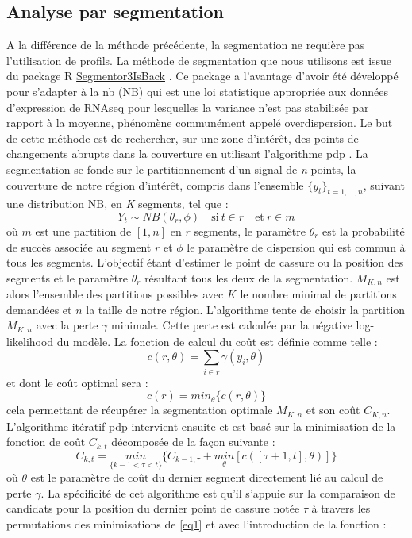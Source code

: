 \documentclass[12pt,a4paper]{report}
\begin{document}
\begin{onehalfspace}
\subsection*{Analyse par segmentation}

A la différence de la méthode précédente, la segmentation ne requière pas l'utilisation de profils. La méthode de segmentation que nous utilisons est issue du package R \href{http://cran.r-project.org/web/packages/Segmentor3IsBack/index.html}{Segmentor3IsBack} \citep{Cleynen2014}. Ce package a l'avantage d'avoir été développé pour s'adapter à la \gls{nb} (NB) qui est une loi statistique appropriée aux données d'expression de RNAseq pour lesquelles la variance n'est pas stabilisée par rapport à la moyenne, phénomène communément appelé overdispersion. Le but de cette méthode est de rechercher, sur une zone d'intérêt, des points de changements abrupts dans la couverture en utilisant l'algorithme \gls{pdp} \citep{Rigaill2010}. La segmentation se fonde sur le partitionnement d'un signal de \emph{n} points, la couverture de notre région d'intérêt, compris dans l'ensemble ${\{y_t\}_{t=1,\ldots,n}}$, suivant une distribution NB, en \emph{K} segments, tel que :
\[ Y_t \sim NB(\theta_r,\phi) \quad \text{si}\ t \in r \quad \text{et}\ r \in m \]
où $m$ est une partition de $[1,n]$ en $r$ segments, le paramètre $\theta_r$ est la probabilité de succès associée au segment $r$ et $\phi$ le paramètre de dispersion qui est commun à tous les segments. L'objectif étant d'estimer le point de cassure ou la position des segments et le paramètre $\theta_r$ résultant tous les deux de la segmentation. $M_{K,n}$ est alors l'ensemble des partitions possibles avec $K$ le nombre minimal de partitions demandées et $n$ la taille de notre région. L'algorithme tente de choisir la partition $M_{K,n}$ avec la perte $\gamma$ minimale. Cette perte est calculée par la négative log-likelihood du modèle. La fonction de calcul du coût est définie comme telle :
\[ c(r,\theta) = \sum_{i \in r} \gamma(y_i,\theta) \]
et dont le coût optimal sera :
\[ c(r) = min_\theta\{c(r,\theta)\} \]
cela permettant de récupérer la segmentation optimale $M_{K,n}$ et son coût $C_{K,n}$. L'algorithme itératif \gls{pdp} intervient ensuite et est basé sur la minimisation de la fonction de coût $C_{k,t}$ décomposée de la façon suivante :
\begin{equation}
\label{eq1}
C_{k,t} = \underset{\{k-1<\tau<t\}}{min} \{C_{k-1,\tau} + \underset{\theta}{min}[c([\tau + 1,t],\theta)]\}
\end{equation}
où $\theta$ est le paramètre de coût du dernier segment directement lié au calcul de perte $\gamma$. La spécificité de cet algorithme est qu'il s'appuie sur la comparaison de candidats pour la position du dernier point de cassure notée $\tau$ à travers les permutations des minimisations de \eqref{eq1} et avec l'introduction de la fonction :

\end{onehalfspace}
\end{document}

